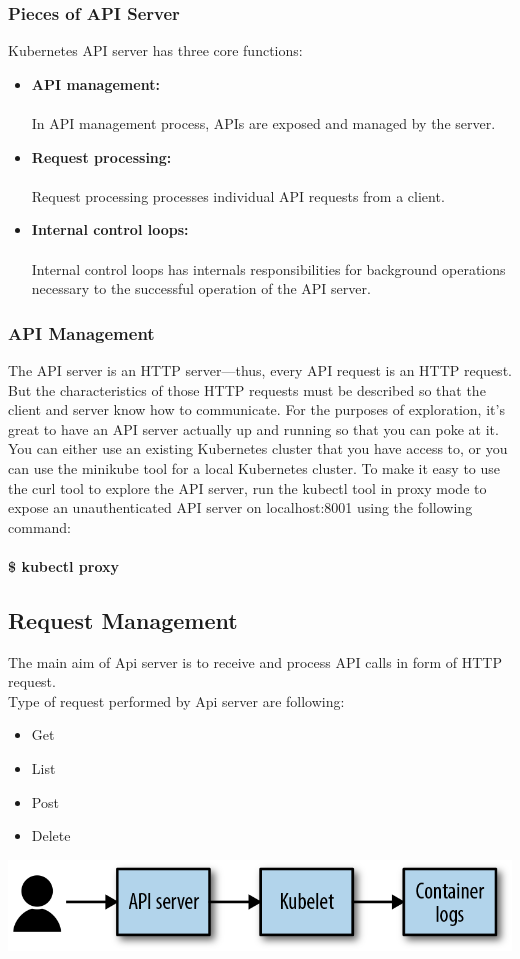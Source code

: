 \documentclass[12pt]{article}
\begin{document}
	\subsubsection{Pieces of API Server}
	Kubernetes API server has three core functions:
	\begin{itemize}
		\item \textbf{API management:}\\\\
		In API management process, APIs are exposed and managed by the server.
		\item \textbf{Request processing:}\\\\
		Request processing processes individual API requests from a client.
		\item \textbf{Internal control loops:}\\\\
		Internal control loops has internals responsibilities for background operations necessary to the successful operation of the API server.
	\end{itemize}
\subsubsection{API Management}
The API server is an HTTP server—thus, every API request is an HTTP request. But the characteristics of those HTTP requests must be described so that the client and server know how to communicate. For the purposes of exploration, it’s great to have an API server actually up and running so that you can poke at it. You can either use an existing Kubernetes cluster that you have access to, or you can use the minikube tool for a local Kubernetes cluster. To make it easy to use the curl tool to explore the API server, run the kubectl tool in proxy mode to expose an unauthenticated API server on localhost:8001 using the following command:\\\\
\textbf{\$ kubectl proxy}
\subsection{Request Management}
The main aim of Api server is to receive and process API calls in form of HTTP request.\\
Type of request performed by Api server are following:
\begin{itemize}
	\item Get
	\item List
	\item Post
	\item Delete
\end{itemize}
\begin{center}
	\includegraphics*[totalheight=0.1\textheight]{kubereqman}
\end{center}
\end{document}
